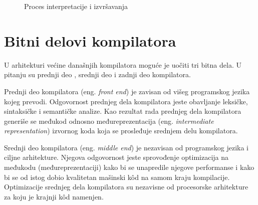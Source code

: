 \documentclass[12pt,oneside]{memoir}
\begin{document}
\begin{figure}
\centering

\caption{Proces interpretacije i izvršavanja}
\label{tikz:interpretacija}
\end{figure}

\section{Bitni delovi kompilatora}
\label{sec:kompilatori}
U arhitekturi većine današnjih kompilatora moguće je uočiti tri bitna dela. 
U pitanju su prednji deo \cite{frontend_quote}, srednji deo \cite{middleend_quote} i zadnji deo \cite{backend_quote} kompilatora.

Prednji deo kompilatora (eng. \textit{front end}) je zavisan od višeg programskog jezika kojeg prevodi. Odgovornost prednjeg dela kompilatora jeste obavljanje leksičke, sintaksičke i semantičke analize. Kao rezultat rada prednjeg dela kompilatora generiše se međukod odnosno međureprezentacija (eng. \textit{intermediate representation}) izvornog koda koja se prosleđuje srednjem delu kompilatora.

Srednji deo kompilatora (eng. \textit{middle end}) je nezavisan od programskog jezika i ciljne arhitekture. Njegova odgovornost jeste sprovođenje optimizacija na međukodu (međureprezentaciji) kako bi se unapredile njegove performanse i kako bi se od istog dobio kvalitetan mašinski k\^od na samom kraju kompilacije. Optimizacije srednjeg dela kompilatora su nezavisne od procesorske arhitekture za koju je krajnji k\^od namenjen. 
\end{document}
